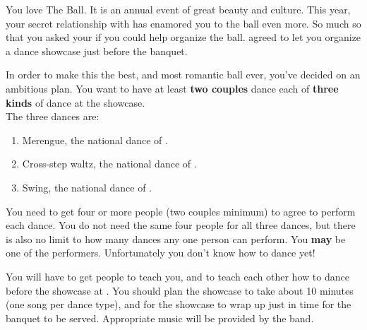 \documentclass[green]{NeptuneBall}
\begin{document}
\name{\gDance{}}

You love The \cExExKing{} Ball. It is an annual event of great beauty and culture. This year, your secret relationship with \cDiplomat{} has enamored you to the ball even more. So much so that you asked your \cKing{\parent} if you could help organize the ball. \cKing{} agreed to let you organize a dance showcase just before the banquet.

In order to make this the best, and most romantic ball ever, you've decided on an ambitious plan.  You want to have at least {\bf two couples} dance each of {\bf three  kinds} of dance at the showcase.\\

The three dances are:
\begin{enumerate}
\item Merengue, the national dance of \pAtlantis{}.
\item Cross-step waltz, the national dance of \pPacifica{}.
\item Swing, the national dance of \pAmerica{}.
\end{enumerate}

You need to get four or more people (two couples minimum) to agree to perform each dance. You do not need the same four people for all three dances, but there is also no limit to how many dances any one person can perform. You {\bf may} be one of the performers. Unfortunately you don't know how to dance yet! 

You will have to get people to teach you, and to teach each other how to dance before the showcase at {\bf \cTOneFifty{}}. You should plan the showcase to take about 10 minutes (one song per dance type), and for the showcase to wrap up just in time for the banquet to be served. Appropriate music will be provided by the band.
\end{document}
